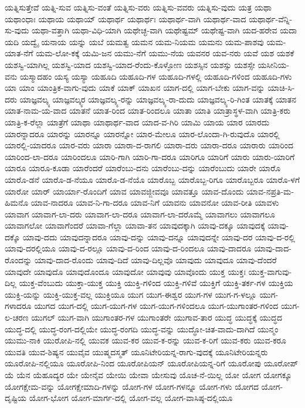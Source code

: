 {ಯತ್ನಿಸುತ್ತೇವೆ
ಯತ್ನಿ-ಸುವ
ಯತ್ನಿಸು-ವಂತೆ
ಯತ್ನಿಸು-ವರು
ಯತ್ನಿಸು-ವವರು
ಯತ್ನಿಸು-ವುದು
ಯತ್ರ
ಯಥಾ
ಯಥಾಂಧಾಃ
ಯಥಾಯ
ಯಥಾಯ್
ಯಥಾರ್ಥ
ಯಥಾರ್ಥಃ
ಯಥಾರ್ಥ-ವಾಗಿ
ಯಥಾರ್ಥ-ವಾದ
ಯಥಾರ್ಥ-ವೆನ್ನಿ-ಸು-ವುದು
ಯಥಾ-ವತ್ತಾಗಿ
ಯಥಾ-ವಿಧಿ-ಯಾಗಿ
ಯಥೇಚ್ಛ-ವಾಗಿ
ಯಥೇಷ್ಟಮ್
ಯಥೇಷ್ಟ-ವಾಗಿ
ಯದ-ಹರೇವ
ಯದಾ
ಯದಿ
ಯದ್ವೈ
ಯನಾಯ
ಯನ್ನು
ಯಬೆ
ಯಮತ್ವ
ಯಮನ
ಯಮ-ನಿಯಮ
ಯಮನು
ಯಮ-ಪಾಶವು
ಯಮ-ಯಾತ-ನೆಗೆ
ಯಮ-ಲೋ-ಕಕ್ಕೆ
ಯಮಿ-ಜನ
ಯಮು-ನೆಗೆ
ಯಮು-ನೆಯ
ಯವನರ
ಯವ-ನರು
ಯವೆ
ಯಶ
ಯಶಕೆ
ಯಶಸ್ವಿ-ಯಾಗಿಲ್ಲ
ಯಶಸ್ವಿ-ಯಾದ
ಯಶಸ್ವಿ-ಯಾದ-ರೆಂದು-ಕೊಳ್ಳೋಣ
ಯಶಸ್ಸಿನ
ಯಶಸ್ಸು
ಯಶಸ್ಸೇ
ಯಸೀನಿಯ-ವನು
ಯಸ್ಮಾದಹಂ
ಯಸ್ಯ
ಯಸ್ಯಾ
ಯಹೂದಿ
ಯಹೂದಿ-ಗಳ
ಯಹೂದಿ-ಗಳಲ್ಲಿ
ಯಹೂದಿ-ಗಳಿಂದ
ಯಹೂದಿ-ಗಳು
ಯಾ
ಯಾಂ
ಯಾಂತ್ರಿಕ-ವಾಗು-ವುದು
ಯಾಕೆ
ಯಾಕ್
ಯಾಖನ
ಯಾಗ-ದಲ್ಲಿ
ಯಾಗ-ಬೇಕು
ಯಾಗ-ವನ್ನು
ಯಾಚಿ-ಸಿ-ದರು
ಯಾಜ್ಞವಲ್ಕ್ಯ
ಯಾಜ್ಞವಲ್ಕ್ಯರ
ಯಾಜ್ಞವಲ್ಕ್ಯ-ರನ್ನು
ಯಾಜ್ಞವಲ್ಕ್ಯ-ರಾ-ದುದು
ಯಾಜ್ಞವಲ್ಕ್ಯ-ರಿ-ಗಿಂತ
ಯಾತಕ್ಕೆ
ಯಾತನ
ಯಾತ-ನಾಮ-ಯ-ವಾದ
ಯಾತನೆ
ಯಾತ-ರಿಂದ
ಯಾತ-ರಿಂದಲೂ
ಯಾತಾ
ಯಾತಿ
ಯಾತ್ರಾಸ್ಥಳ-ವಾಗಿ
ಯಾತ್ರಿ-ಕರು
ಯಾತ್ರಿ-ಕ-ರೆಲ್ಲಾ
ಯಾತ್ರೆಗೆ
ಯಾಥಾ
ಯಾಥಾರ್ಥ-ವಾದ
ಯಾದ-ವ-ಗಿರಿ
ಯಾಮಿ
ಯಾಯ
ಯಾರ
ಯಾರದು
ಯಾರನ್ನಾದರೂ
ಯಾರನ್ನು
ಯಾರನ್ನೂ
ಯಾರನ್ನೋ
ಯಾರ-ಮೇಲೂ
ಯಾರ-ಲೊಂದಾ-ಗಿ-ರುವುದೊ
ಯಾರಲ್ಲಿ
ಯಾರಲ್ಲಿ-ಯಾದರೂ
ಯಾರ-ವರು
ಯಾರಾ
ಯಾರಾ-ದ-ರಾಗಲಿ
ಯಾರಾ-ದರು
ಯಾರಾ-ದರೂ
ಯಾರಾರು
ಯಾರಿಂದ
ಯಾರಿಂದ-ಲಾ-ದರೂ
ಯಾರಿಂದಲೂ
ಯಾರಿ-ಗಾಗಿ
ಯಾರಿ-ಗಾ-ದರೂ
ಯಾರಿಗೂ
ಯಾರಿಗೆ
ಯಾರು
ಯಾರು-ಯಾರಿಗೆ
ಯಾರೂ
ಯಾರೂ-ಕೂಡಾ
ಯಾರೆಂದರೆ
ಯಾರೆಂಬು-ದನು
ಯಾರೆಂಬು-ದನ್ನು
ಯಾರೆಂಬುದು
ಯಾರೇ
ಯಾರೊ
ಯಾರೊ-ಡನೆ
ಯಾರೊ-ಡ-ನೆಯೂ
ಯಾರೊ-ಡ-ನೆಯೊ
ಯಾರೊಬ್ಬ
ಯಾರೊಬ್ಬ-ರಿಗೂ
ಯಾರೊಬ್ಬರೂ
ಯಾರೊ-ಳಗೆ
ಯಾರೋ
ಯಾರ್
ಯಾರ್ಯಾ-ರೊಂದಿಗೆ
ಯಾವ
ಯಾವಜ್ಜೀವವೂ
ಯಾವತ್ತೂ
ಯಾವ-ದೊಂದು
ಯಾವ-ನಪ್ರತಿ-ಮ-ಹಿಮನೊ
ಯಾವ-ನಾದರೂ
ಯಾವ-ನಿ-ಗಾ-ದರೂ
ಯಾವ-ನಿಗೆ
ಯಾವನು
ಯಾವನೋ
ಯಾವ-ರೀತಿ
ಯಾವಳು
ಯಾವಾಗ
ಯಾವಾಗ-ಲಾ-ದರು
ಯಾವಾಗ-ಲಾ-ದರೂ
ಯಾವಾಗ-ಲಾ-ದರೊಮ್ಮೆ
ಯಾವಾಗಲು
ಯಾವಾಗಲೂ
ಯಾವಾಗಲೋ
ಯಾವಾಗೆಂದರೆ
ಯಾವಾ-ಗೆಲ್ಲಾ
ಯಾವಾ-ತನ
ಯಾವುದಕ್ಕಾಗಿ
ಯಾವು-ದಕ್ಕೂ
ಯಾವುದಕ್ಕೆ
ಯಾವು-ದಕ್ಕೊ
ಯಾವು-ದದು
ಯಾವುದನ್ನಾದರೂ
ಯಾವು-ದನ್ನು
ಯಾವು-ದನ್ನೂ
ಯಾವುದನ್ನೇ
ಯಾವು-ದರ
ಯಾವು-ದ-ರಲ್ಲಿ
ಯಾವು-ದರಲ್ಲಿಯೂ
ಯಾವು-ದ-ರಲ್ಲೂ
ಯಾವು-ದ-ರಿಂದ
ಯಾವು-ದ-ರಿಂದಲೂ
ಯಾವು-ದಾದರೂ
ಯಾವು-ದಾದ-ರೊಂದನ್ನು
ಯಾವು-ದಾದ-ರೊಂದು
ಯಾವು-ದಿದೆ
ಯಾವು-ದಿಲ್ಲವೊ
ಯಾವುದು
ಯಾವುದೂ
ಯಾವು-ದೆಂದರೆ
ಯಾವುದೇ
ಯಾವುದೊ
ಯಾವುದೊಂದೂ
ಯಾವುದೋ
ಯಾವುವು
ಯಾವೊಂದು
ಯುಕ್ತ
ಯುಕ್ತಃ
ಯುಕ್ತ-ವಾಗುವು-ದಿಲ್ಲ
ಯುಕ್ತ-ವೆಂಬುದು
ಯುಕ್ತಾ-ಯುಕ್ತ
ಯುಕ್ತಿ
ಯುಕ್ತಿ-ಗಳಿಂದ
ಯುಕ್ತಿ-ಗಳಿವೆ
ಯುಕ್ತಿಗೆ
ಯುಕ್ತಿ-ತರ್ಕ-ಗಳ
ಯುಕ್ತಿಯ
ಯುಕ್ತಿ-ಯನ್ನು
ಯುಕ್ತಿ-ಯುಕ್ತ-ವಲ್ಲ
ಯುಕ್ತಿಯೂ
ಯುಗ
ಯುಗ-ಈಶ್ವರ
ಯುಗ-ಗಳ
ಯುಗ-ಗ-ಳಲ್ಲೂ
ಯುಗ-ಗಳಾದರೂ
ಯುಗದ
ಯುಗ-ದಲ್ಲಿ
ಯುಗ-ಯುಗ-ಗಳ
ಯುಗ-ಯುಗ-ಗಳಿಂದಲೂ
ಯುಗ-ಯುಗಾಂತರ-ಗಳಿಂದ
ಯುಗ-ಲ-ಚರಣ
ಯುಗಲ್
ಯುಗ-ವಾಗಿ
ಯುಗಾಂತರ-ಗಳ
ಯುಗಾಂತರೇ
ಯುಗಾವ-ತಾರ
ಯುದ್ಧ
ಯುದ್ಧಕ್ಕೆ
ಯುದ್ಧದ
ಯುದ್ಧ-ದಲ್ಲಿ
ಯುದ್ಧ-ರಂಗ-ದಲ್ಲಿಯೇ
ಯುದ್ಧ-ರಂಗದಿ
ಯುದ್ಧ-ವನ್ನು
ಯುದ್ಧೋ-ಚಿತ-ವಾದು-ದಾಗಿದೆ
ಯುನ್ಮಂ
ಯುಮು-ನಾಕಿ
ಯುರೋಪಿ-ನಲ್ಲಿ
ಯುವಕ
ಯುವ-ಕರ
ಯುವ-ಕ-ರನ್ನು
ಯುವ-ಕ-ರಿಗೆ
ಯುವ-ಕರು
ಯುವ-ಕರೂ
ಯುವತಿ
ಯುವ-ಶಿಷ್ಯನ
ಯುವೈವ
ಯುಷ್ಮದಸ್ಮತ್
ಯೂನಿಟೇರಿಯನ್ನ-ರಾಗು-ವುದಕ್ಕೆ
ಯೂನಿಟೇರಿಯನ್ನರು
ಯೂರೋಪಿ-ನಲ್ಲಿಯೂ
ಯೂರೋಪಿ-ನಿಂದ
ಯೂರೋಪಿಯನ್
ಯೂರೋಪಿಯನ್ನ-ರಿಗೆ
ಯೂರೋಪು
ಯೂರೋಪ್
ಯೆ
ಯೆನ
ಯೆಹೂದ್ಯರ
ಯೇ
ಯೇನೈವ
ಯೇಯಿ
ಯೇವಾ
ಯೇಸುವು
ಯೊಚ-ನೆ-ಯಿಲ್ಲ
ಯೋ
ಯೋಗ
ಯೋಗಕ್ಕೂ
ಯೋಗಕ್ಷೇಮ-ವನ್ನು
ಯೋಗಕ್ಷೇಮಾದಿ-ಗಳನ್ನು
ಯೋಗ-ಗಳ
ಯೋಗ-ಗಳನ್ನೂ
ಯೋಗ-ಗಳು
ಯೋಗದ
ಯೋಗ-ದೃಷ್ಟಿಯ
ಯೋಗ-ಭೋಗ
ಯೋಗ-ಮಾರ್ಗ-ದಲ್ಲಿ
ಯೋಗ-ವಲ್ಲ
ಯೋಗ-ವಾಸಿಷ್ಠ-ದಲ್ಲಿಯೂ
}
